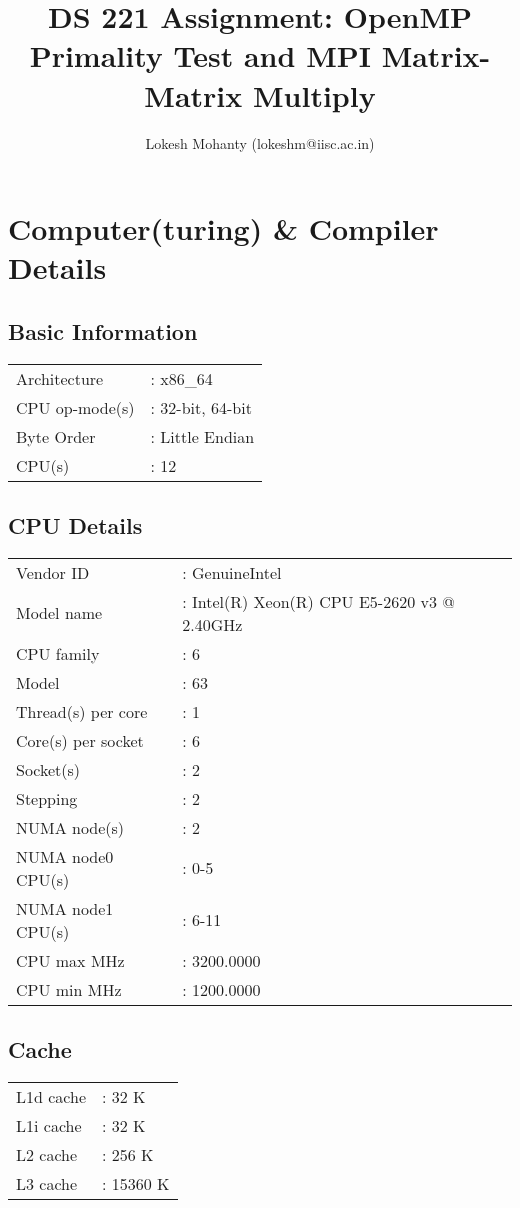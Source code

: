 \documentclass[12pt, letterpaper]{article}
\title{DS 221 Assignment: OpenMP Primality Test and MPI Matrix-Matrix Multiply}
\author{Lokesh Mohanty (lokeshm@iisc.ac.in)}
\begin{document}
\maketitle

\section{Computer(turing) \& Compiler Details}
\label{sec:comp}

\subsection{Basic Information}
\label{sec:basic}
\begin{tabular}{@{$\bullet$ }ll}
  Architecture    &: x86\_64\\
  CPU op-mode(s)  &: 32-bit, 64-bit\\
  Byte Order      &: Little Endian\\
  CPU(s)          &: 12\\
\end{tabular}

\subsection{CPU Details}
\label{sec:cpu}
\begin{tabular}{@{$\bullet$ }ll}
  Vendor ID       &: GenuineIntel\\
  Model name            &: Intel(R) Xeon(R) CPU E5-2620 v3 @ 2.40GHz\\
  CPU family            &: 6\\
  Model                 &: 63\\
  Thread(s) per core    &: 1\\
  Core(s) per socket    &: 6\\
  Socket(s)             &: 2\\
  Stepping              &: 2\\
  NUMA node(s)          &: 2\\
  NUMA node0 CPU(s)     &: 0-5\\
  NUMA node1 CPU(s)     &: 6-11\\
  CPU max MHz           &: 3200.0000\\
  CPU min MHz           &: 1200.0000\\
\end{tabular}

\subsection{Cache}
\label{sec:cache}
\begin{tabular}{@{$\bullet$ }ll}
  L1d cache  &: 32 K\\
  L1i cache  &: 32 K\\
  L2 cache   &: 256 K\\
  L3 cache   &: 15360 K\\
\end{tabular}
\end{document}

